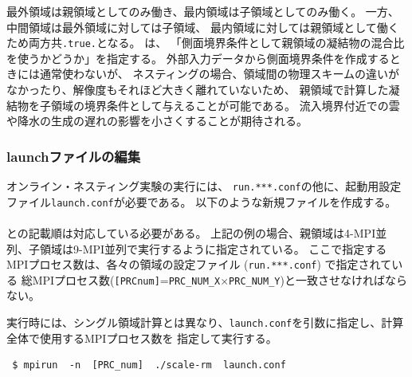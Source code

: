 \noindent 最外領域は親領域としてのみ働き、最内領域は子領域としてのみ働く。
一方、中間領域は最外領域に対しては子領域、
最内領域に対しては親領域として働くため両方共\verb|.true.|となる。
は、
「側面境界条件として親領域の凝結物の混合比を使うかどうか」を指定する。
外部入力データから側面境界条件を作成するときには通常使わないが、
ネスティングの場合、領域間の物理スキームの違いがなかったり、解像度もそれほど大きく離れていないため、
親領域で計算した凝結物を子領域の境界条件として与えることが可能である。
流入境界付近での雲や降水の生成の遅れの影響を小さくすることが期待される。



\subsubsection{launchファイルの編集}
\label{subsubsec:launch}
オンライン・ネスティング実験の実行には、
\verb|run.***.conf|の他に、起動用設定ファイル\verb|launch.conf|が必要である。
以下のような新規ファイルを作成する。\\

\\

\noindent 
{}との記載順は対応している必要がある。
上記の例の場合、親領域は4-MPI並列、子領域は9-MPI並列で実行するように指定されている。
ここで指定するMPIプロセス数は、各々の領域の設定ファイル (\verb|run.***.conf|) で指定されている
総MPIプロセス数(\verb|[PRCnum]|=\verb|PRC_NUM_X|$\times$\verb|PRC_NUM_Y|)と一致させなければならない。

実行時には、シングル領域計算とは異なり、\verb|launch.conf|を引数に指定し、計算全体で使用するMPIプロセス数を
指定して実行する。
\begin{verbatim}
 $ mpirun  -n  [PRC_num]  ./scale-rm  launch.conf
\end{verbatim}

